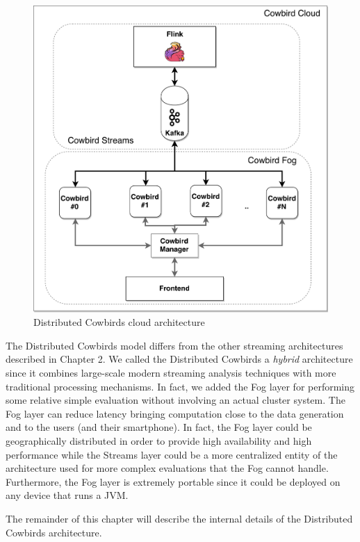  \begin{figure}[h!]
\includegraphics[width=1\textwidth]{images/cowbird_distributed.pdf}
 \caption{Distributed Cowbirds cloud architecture}
\label{fig:distributed_cowbirds}
\end{figure}

The Distributed Cowbirds model differs from the other streaming architectures described in Chapter 2. We called the Distributed Cowbirds a \emph{hybrid} architecture since it combines large-scale modern streaming analysis techniques with more traditional processing mechanisms. In fact, we added the Fog layer for performing some relative simple evaluation without involving an actual cluster system. The Fog layer can reduce latency bringing computation close to the data generation and to the users (and their smartphone). In fact, the Fog layer could be geographically distributed in order to provide high availability and high performance while the Streams layer could be a more centralized entity of the architecture used for more complex evaluations that the Fog cannot handle. Furthermore, the Fog layer is extremely portable since it could be deployed on any device that runs a JVM. 

The remainder of this chapter will describe the internal details of the Distributed Cowbirds architecture. 

